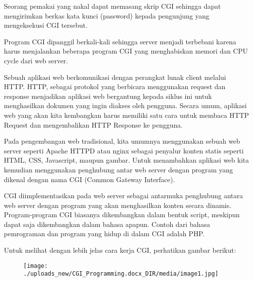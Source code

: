 \documentclass{wileySix}
\begin{document}
\begin{myEnumerate}
	\item Seorang pemakai yang nakal dapat memasang skrip CGI sehingga dapat mengirimkan berkas kata kunci (password) kepada pengunjung yang mengeksekusi CGI tersebut. \par
	\noindent 
	\item Program CGI dipanggil berkali-kali sehingga server menjadi terbebani karena harus menjalankan beberapa program CGI yang menghabiskan memori dan CPU cycle dari web server.\end{myEnumerate}
\par
\vspace{12pt}
Sebuah aplikasi web berkomunikasi dengan perangkat lunak client melalui HTTP. HTTP, sebagai protokol yang berbicara menggunakan request dan response menjadikan aplikasi web bergantung kepada siklus ini untuk menghasilkan dokumen yang ingin diakses oleh pengguna. Secara umum, aplikasi web yang akan kita kembangkan harus memiliki satu cara untuk membaca HTTP Request dan mengembalikan HTTP Response ke pengguna. \par
\vspace{12pt}
Pada pengembangan web tradisional, kita umumnya menggunakan sebuah web server seperti Apache HTTPD atau nginx sebagai penyalur konten statis seperti HTML, CSS, Javascript, maupun gambar. Untuk menambahkan aplikasi web kita kemudian menggunakan penghubung antar web server dengan program yang dikenal dengan nama CGI (Common Gateway Interface). \par
\vspace{12pt}
CGI diimplementasikan pada web server sebagai antarmuka penghubung antara web server dengan program yang akan menghasilkan konten secara dinamis. Program-program CGI biasanya dikembangkan dalam bentuk script, meskipun dapat saja dikembangkan dalam bahasa apapun. Contoh dari bahasa pemrograman dan program yang hidup di dalam CGI adalah PHP. \par
\noindent 
Untuk melihat dengan lebih jelas cara kerja CGI, perhatikan gambar berikut: \par
\vspace{12pt}
\noindent 




\begin{figure}[H]
	\begin{center}
		\texttt{[image: ./uploads\_new/CGI\_Programming.docx\_DIR/media/image1.jpg]}
	\end{center}
\end{figure}
\end{document}
